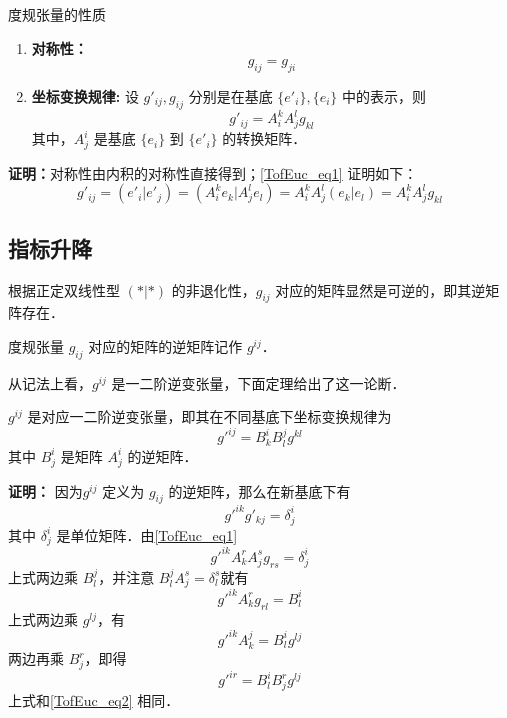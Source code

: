 \begin{theorem}{度规张量的性质}
\begin{enumerate}
\item \textbf{对称性：}\begin{equation}
g_{ij}=g_{ji}
\end{equation}
\item \textbf{坐标变换规律:} 设 $g'_{ij},g_{ij}$ 分别是在基底 $\{e'_i\},\{e_i\}$ 中的表示，则
\begin{equation}\label{TofEuc_eq1}
g'_{ij}=A^k_{i} A^l_{j}g_{kl}
\end{equation}
其中，$A^i_j$ 是基底 $\{e_i\}$ 到 $\{e'_i\}$ 的转换矩阵．
\end{enumerate}
\end{theorem}
\textbf{证明：}对称性由内积的对称性直接得到；\autoref{TofEuc_eq1} 证明如下：
\begin{equation}
g'_{ij}=(e'_i|e'_j)=(A^k_i e_k|A^l_j e_l)=A^k_{i} A^l_{j}(e_k|e_l)=A^k_{i} A^l_{j}g_{kl}
\end{equation}

\subsection{指标升降}
根据正定双线性型 $(*|*)$ 的非退化性，$g_{ij}$ 对应的矩阵显然是可逆的，即其逆矩阵存在．
\begin{definition}{}
度规张量 $g_{ij}$ 对应的矩阵的逆矩阵记作 $g^{ij}$．
\end{definition}
从记法上看，$g^{ij}$ 是一二阶逆变张量，下面定理给出了这一论断．
\begin{theorem}{}
$g^{ij}$ 是对应一二阶逆变张量，即其在不同基底下坐标变换规律为
\begin{equation}\label{TofEuc_eq2}
g'^{ij}=B^i_kB^j_l g^{kl}
\end{equation}
其中 $B^i_j$ 是矩阵 $A^i_j$ 的逆矩阵．
\end{theorem} 

\textbf{证明：}
因为$g^{ij}$ 定义为 $g_{ij}$ 的逆矩阵，那么在新基底下有 \begin{equation}
g'^{ik}g'_{kj}=\delta^i_j
\end{equation}
其中 $\delta^i_j$ 是单位矩阵．由\autoref{TofEuc_eq1} 
\begin{equation}
g'^{ik}A^r_k A^s_j g_{rs}=\delta^i_j
\end{equation}
上式两边乘 $B^j_l$，并注意 $B^j_lA^s_j=\delta^s_l$就有
\begin{equation}
g'^{ik}A^r_k g_{rl}=B^
i_l
\end{equation}
上式两边乘 $g^{lj}$，有
\begin{equation}
g'^{ik}A^j_k=B^i_lg^{lj}
\end{equation}
两边再乘 $B^r_j$，即得
\begin{equation}
g'^{ir}=B^i_lB^r_jg^{lj}
\end{equation}
上式和\autoref{TofEuc_eq2} 相同．

